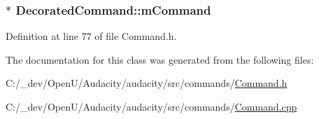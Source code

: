 \subsubsection[{\texorpdfstring{m\+Command}{mCommand}}]{$\ast$ Decorated\+Command\+::m\+Command\hspace{0.3cm}{\ttfamily [protected]}}\hypertarget{class_decorated_command_aae0c3e0ac3ae92218a869663c78aa322}{}\label{class_decorated_command_aae0c3e0ac3ae92218a869663c78aa322}


Definition at line 77 of file Command.\+h.



The documentation for this class was generated from the following files\+:\begin{DoxyCompactItemize}
\item 
C\+:/\+\_\+dev/\+Open\+U/\+Audacity/audacity/src/commands/\hyperlink{_command_8h}{Command.\+h}\item 
C\+:/\+\_\+dev/\+Open\+U/\+Audacity/audacity/src/commands/\hyperlink{_command_8cpp}{Command.\+cpp}\end{DoxyCompactItemize}
